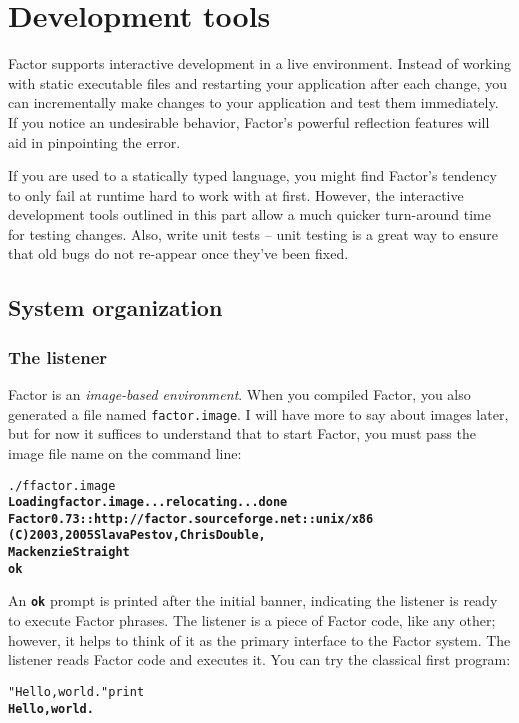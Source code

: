 \documentclass{book}
\begin{document}
\part{Development tools}

Factor supports interactive development in a live environment. Instead of working with
static executable files and restarting your application after each change, you can
incrementally make changes to your application and test them immediately. If you
notice an undesirable behavior, Factor's powerful reflection features will aid in
pinpointing the error.

If you are used to a statically typed language, you might find Factor's tendency to only fail at runtime hard to work with at first. However, the interactive development tools outlined in this part allow a much quicker turn-around time for testing changes. Also, write unit tests -- unit testing is a great way to ensure that old bugs do not re-appear once they've been fixed.

\chapter{System organization}

\section{The listener}\label{listener}

Factor is an \emph{image-based environment}. When you compiled Factor, you also generated a file named \texttt{factor.image}. I will have more to say about images later, but for now it suffices to understand that to start Factor, you must pass the image file name on the command line:
\begin{alltt}
./f factor.image
\textbf{Loading factor.image... relocating... done
Factor 0.73 :: http://factor.sourceforge.net :: unix/x86
(C) 2003, 2005 Slava Pestov, Chris Double,
Mackenzie Straight
ok}
\end{alltt}
An \texttt{\textbf{ok}} prompt is printed after the initial banner, indicating the listener is ready to execute Factor phrases. The listener is a piece of Factor code, like any other; however, it helps to think of it as the primary interface to the Factor system. The listener reads Factor code and executes it. You can try the classical first program:

\begin{alltt}
  "Hello, world." print
\textbf{Hello, world.}
\end{alltt}
\end{document}
